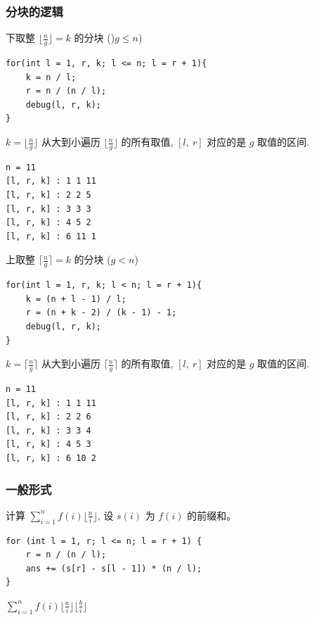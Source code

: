 \documentclass[UTF8, a4paper, titlepage, twoside]{ctexart}
\begin{document}
\subsubsection*{ 分块的逻辑 }

下取整 $\lfloor \frac{n}{g} \rfloor = k$ 的分块 ()$g \leqslant n$)

\begin{lstlisting}[style=cpp]
for(int l = 1, r, k; l <= n; l = r + 1){
    k = n / l;
    r = n / (n / l);
    debug(l, r, k);
}
\end{lstlisting}

$k = \lfloor \frac{n}{g} \rfloor$ 从大到小遍历 $\lfloor \frac{n}{g} \rfloor$ 的所有取值, $[l, \ r]$ 对应的是 $g$ 取值的区间.

\begin{lstlisting}[style=cpp]
n = 11
[l, r, k] : 1 1 11 
[l, r, k] : 2 2 5 
[l, r, k] : 3 3 3 
[l, r, k] : 4 5 2 
[l, r, k] : 6 11 1 
\end{lstlisting}

上取整 $\lceil \frac{n}{g} \rceil = k$ 的分块 ($g < n$)

\begin{lstlisting}[style=cpp]
for(int l = 1, r, k; l < n; l = r + 1){
    k = (n + l - 1) / l;
    r = (n + k - 2) / (k - 1) - 1;
    debug(l, r, k);
}
\end{lstlisting}

$k = \lceil \frac{n}{g} \rceil$ 从大到小遍历 $\lceil \frac{n}{g} \rceil$ 的所有取值, $[l, \ r]$ 对应的是 $g$ 取值的区间.

\begin{lstlisting}[style=cpp]
n = 11
[l, r, k] : 1 1 11 
[l, r, k] : 2 2 6 
[l, r, k] : 3 3 4 
[l, r, k] : 4 5 3 
[l, r, k] : 6 10 2 
\end{lstlisting}

\subsubsection*{ 一般形式 }

计算 $\sum_{i=1}^n f(i)\lfloor \frac{n}{i} \rfloor$, 设 $s(i)$ 为 $f(i)$ 的前缀和。

\begin{lstlisting}[style=cpp]
for (int l = 1, r; l <= n; l = r + 1) {
    r = n / (n / l);
    ans += (s[r] - s[l - 1]) * (n / l);
}
\end{lstlisting}

$\sum_{i = 1}^{n}f(i){\lfloor{\frac{a}{i}}\rfloor\lfloor{\frac{b}{i}}\rfloor}$
\end{document}
